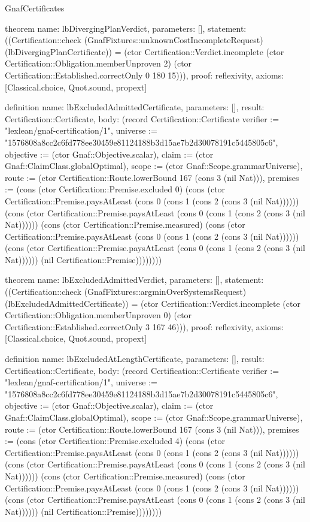 \begin{lexlean}{GnafCertificates}
\begin{semanticmodule}
theorem{
  name: lbDivergingPlanVerdict,
  parameters: [],
  statement: ((Certification::check (GnafFixtures::unknownCostIncompleteRequest) (lbDivergingPlanCertificate)) = (ctor Certification::Verdict.incomplete (ctor Certification::Obligation.memberUnproven 2) (ctor Certification::Established.correctOnly 0 180 15))),
  proof: reflexivity{},
  axioms: [Classical.choice, Quot.sound, propext]
}

definition{
  name: lbExcludedAdmittedCertificate,
  parameters: [],
  result: Certification::Certificate,
  body: (record Certification::Certificate {verifier := "lexlean/gnaf-certification/1", universe := "1576808a8cc2c6fd778ee30459e81124188b3d15ae7b2d30078191c5445805c6", objective := (ctor Gnaf::Objective.scalar), claim := (ctor Gnaf::ClaimClass.globalOptimal), scope := (ctor Gnaf::Scope.grammarUniverse), route := (ctor Certification::Route.lowerBound 167 (cons 3 (nil Nat))), premises := (cons (ctor Certification::Premise.excluded 0) (cons (ctor Certification::Premise.paysAtLeast (cons 0 (cons 1 (cons 2 (cons 3 (nil Nat)))))) (cons (ctor Certification::Premise.paysAtLeast (cons 0 (cons 1 (cons 2 (cons 3 (nil Nat)))))) (cons (ctor Certification::Premise.measured) (cons (ctor Certification::Premise.paysAtLeast (cons 0 (cons 1 (cons 2 (cons 3 (nil Nat)))))) (cons (ctor Certification::Premise.paysAtLeast (cons 0 (cons 1 (cons 2 (cons 3 (nil Nat)))))) (nil Certification::Premise)))))))})
}

theorem{
  name: lbExcludedAdmittedVerdict,
  parameters: [],
  statement: ((Certification::check (GnafFixtures::argminOverSystemsRequest) (lbExcludedAdmittedCertificate)) = (ctor Certification::Verdict.incomplete (ctor Certification::Obligation.memberUnproven 0) (ctor Certification::Established.correctOnly 3 167 46))),
  proof: reflexivity{},
  axioms: [Classical.choice, Quot.sound, propext]
}

definition{
  name: lbExcludedAtLengthCertificate,
  parameters: [],
  result: Certification::Certificate,
  body: (record Certification::Certificate {verifier := "lexlean/gnaf-certification/1", universe := "1576808a8cc2c6fd778ee30459e81124188b3d15ae7b2d30078191c5445805c6", objective := (ctor Gnaf::Objective.scalar), claim := (ctor Gnaf::ClaimClass.globalOptimal), scope := (ctor Gnaf::Scope.grammarUniverse), route := (ctor Certification::Route.lowerBound 167 (cons 3 (nil Nat))), premises := (cons (ctor Certification::Premise.excluded 4) (cons (ctor Certification::Premise.paysAtLeast (cons 0 (cons 1 (cons 2 (cons 3 (nil Nat)))))) (cons (ctor Certification::Premise.paysAtLeast (cons 0 (cons 1 (cons 2 (cons 3 (nil Nat)))))) (cons (ctor Certification::Premise.measured) (cons (ctor Certification::Premise.paysAtLeast (cons 0 (cons 1 (cons 2 (cons 3 (nil Nat)))))) (cons (ctor Certification::Premise.paysAtLeast (cons 0 (cons 1 (cons 2 (cons 3 (nil Nat)))))) (nil Certification::Premise)))))))})
}


\end{semanticmodule}
\end{lexlean}
